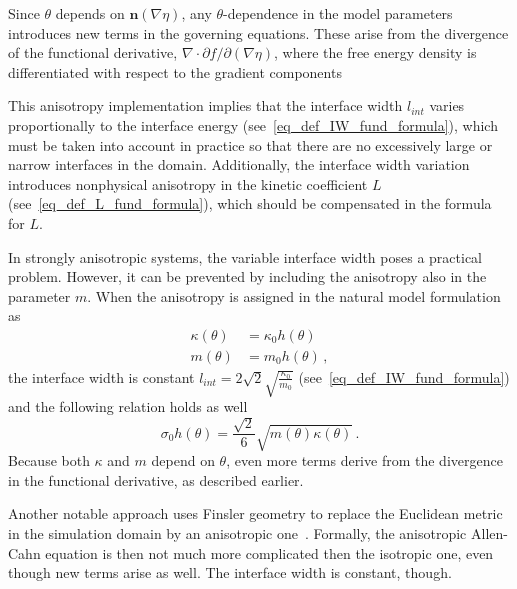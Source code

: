 	Since $\theta$ depends on $\bm{n}(\nabla\eta)$, any $\theta$-dependence in the model parameters introduces new terms in the governing equations. These arise from the divergence of the functional derivative, $\nabla\cdot\partial f/\partial(\nabla \eta)$, where the free energy density is differentiated with respect to the gradient components
	
	
	This anisotropy implementation implies that the interface width $l_{int}$ varies proportionally to the interface energy (see~\eqref{eq_def_IW_fund_formula}), which must be taken into account in practice so that there are no excessively large or narrow interfaces in the domain. Additionally, the interface width variation introduces nonphysical anisotropy in the kinetic coefficient $L$ (see~\eqref{eq_def_L_fund_formula}), which should be compensated in the formula for $L$.
	
	In strongly anisotropic systems, the variable interface width poses a practical problem. However, it can be prevented by including the anisotropy also in the parameter $m$. When the anisotropy is assigned in the natural model formulation as
	\begin{align}
		\kappa(\theta) 	&= \kappa_0 h(\theta) \\
		m(\theta) 		&= m_0 h(\theta) \,,
	\end{align}
	the interface width is constant $l_{int}=2\sqrt{2}\sqrt{\frac{\kappa_0}{m_0}} $ (see~\eqref{eq_def_IW_fund_formula}) and the following relation holds as well
	\begin{equation}
		\sigma_0 h(\theta) = \frac{\sqrt{2}}{6}\sqrt{m(\theta)\kappa(\theta)} \,.
	\end{equation}
	Because both $\kappa$ and $m$ depend on $\theta$, even more terms derive from the divergence in the functional derivative, as described earlier. 

	Another notable approach uses Finsler geometry to replace the Euclidean metric in the simulation domain by an anisotropic one~\cite{Bellettini1996,Benes2003}. Formally, the anisotropic Allen-Cahn equation is then not much more complicated then the isotropic one, even though new terms arise as well. The interface width is constant, though.
	
